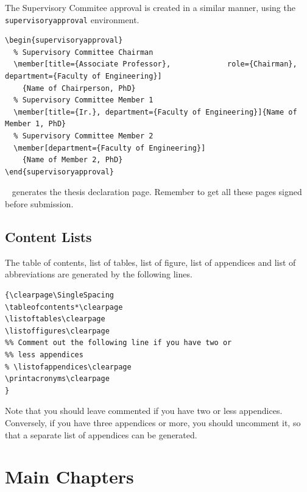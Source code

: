 \documentclass[a4paper,nofonts,raggedright,titlepage,openany]{tufte-book}
\begin{document}
The Supervisory Commitee approval  is created in a similar manner, using the \texttt{supervisoryapproval} environment.

\begin{verbatim}
\begin{supervisoryapproval}
  % Supervisory Committee Chairman
  \member[title={Associate Professor},             role={Chairman},                           department={Faculty of Engineering}]
    {Name of Chairperson, PhD}
  % Supervisory Committee Member 1
  \member[title={Ir.}, department={Faculty of Engineering}]{Name of Member 1, PhD}
  % Supervisory Committee Member 2
  \member[department={Faculty of Engineering}]
    {Name of Member 2, PhD}
\end{supervisoryapproval}

\end{verbatim}

\texttt{\declarationpage
} generates the thesis declaration page. Remember to get all these pages signed before submission.

\subsection{Content Lists}
\label{sec:content:lists}

The table of contents, list of tables, list of figure, list of appendices  and list of abbreviations are generated by the following lines.

\begin{verbatim}
{\clearpage\SingleSpacing
\tableofcontents*\clearpage
\listoftables\clearpage
\listoffigures\clearpage
%% Comment out the following line if you have two or 
%% less appendices
% \listofappendices\clearpage
\printacronyms\clearpage
}
\end{verbatim}

Note that you should leave \texttt{\listofappendices} commented if you have two or less appendices.  Conversely,  if you have three appendices or more, you should uncomment it, so that a separate list of appendices can be generated.


\section{Main Chapters}
\end{document}
